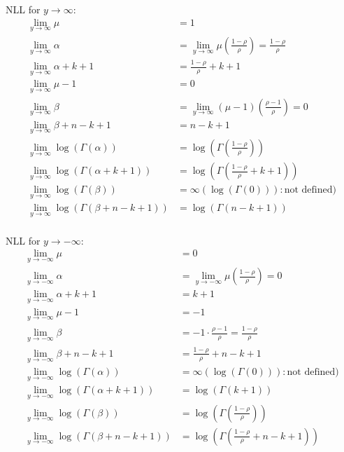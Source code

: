 \documentclass[12pt,a4paper, fleqn]{article}
\begin{document}
NLL for $y \rightarrow \infty$:
\begin{align*}
\lim_{y \rightarrow \infty} \mu &= 1 \\
\lim_{y \rightarrow \infty} \alpha &= \lim_{y \rightarrow \infty} \mu \left(\frac{1-\rho}{\rho}\right) = \frac{1-\rho}{\rho} \\
\lim_{y \rightarrow \infty} \alpha + k + 1 &= \frac{1 - \rho}{\rho} + k + 1 \\
\lim_{y \rightarrow \infty} \mu - 1 &= 0 \\
\lim_{y \rightarrow \infty} \beta &= \lim_{y \rightarrow \infty} (\mu - 1)\left(\frac{\rho - 1}{\rho}\right) = 0 \\	
\lim_{y \rightarrow \infty} \beta + n - k + 1 &= n - k + 1 \\
\lim_{y \rightarrow \infty} \log(\Gamma(\alpha)) &= \log(\Gamma(\frac{1-\rho}{\rho})) \\
\lim_{y \rightarrow \infty} \log(\Gamma(\alpha + k + 1)) &= \log(\Gamma(\frac{1-\rho}{\rho} + k + 1)) \\
\lim_{y \rightarrow \infty} \log(\Gamma(\beta)) &= \infty (\log(\Gamma(0))): \text{not defined} ) \\
\lim_{y \rightarrow \infty} \log(\Gamma(\beta + n - k + 1)) &= \log(\Gamma(n - k + 1))\\
\end{align*}

NLL for $y \rightarrow -\infty$:
\begin{align*}
\lim_{y \rightarrow -\infty} \mu &= 0 \\
\lim_{y \rightarrow -\infty} \alpha &= \lim_{y \rightarrow -\infty} \mu \left(\frac{1-\rho}{\rho}\right) = 0 \\
\lim_{y \rightarrow -\infty} \alpha + k + 1 &= k + 1 \\	
\lim_{y \rightarrow -\infty} \mu - 1 &= -1 \\
\lim_{y \rightarrow -\infty} \beta &= -1 \cdot \frac{\rho - 1}{\rho} = \frac{1-\rho}{\rho} \\
\lim_{y \rightarrow -\infty} \beta + n - k + 1 &= \frac{1-\rho}{\rho} + n - k + 1 \\
\lim_{y \rightarrow -\infty} \log(\Gamma(\alpha)) &= \infty (\log(\Gamma(0))): \text{not defined} ) \\
\lim_{y \rightarrow -\infty} \log(\Gamma(\alpha + k + 1)) &= \log(\Gamma(k + 1)) \\
\lim_{y \rightarrow -\infty} \log(\Gamma(\beta)) &= \log(\Gamma(\frac{1-\rho}{\rho}))\\
\lim_{y \rightarrow -\infty} \log(\Gamma(\beta + n - k + 1)) &= \log(\Gamma(\frac{1-\rho}{\rho} + n - k + 1))\\
\end{align*}
\end{document}
